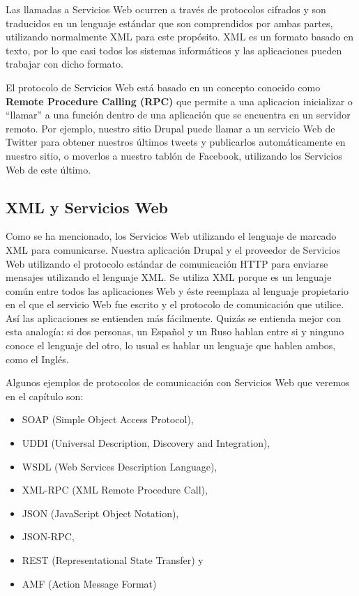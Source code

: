 Las llamadas a Servicios Web ocurren a través de protocolos cifrados y son traducidos en un lenguaje
estándar que son comprendidos por ambas partes, utilizando normalmente XML para este propósito. 
XML es un formato basado en texto, por lo que casi todos los sistemas informáticos y las aplicaciones 
pueden trabajar con dicho formato.

El protocolo de Servicios Web está basado en un concepto conocido como \textbf{Remote Procedure Calling (RPC)}
que permite a una aplicacion inicializar o ``llamar'' a una función dentro de una aplicación que se 
encuentra en un servidor remoto. Por ejemplo, nuestro sitio Drupal puede llamar a un servicio Web de 
Twitter para obtener nuestros últimos tweets y publicarlos automáticamente en nuestro sitio, o 
moverlos a nuestro tablón de Facebook, utilizando los Servicios Web de este último.

\subsection{\large{XML y Servicios Web}}

Como se ha mencionado, los Servicios Web utilizando el lenguaje de marcado XML para comunicarse.
Nuestra aplicación Drupal y el proveedor de Servicios Web utilizando el protocolo estándar de comunicación 
HTTP para enviarse mensajes utilizando el lenguaje XML. Se utiliza XML porque es un lenguaje común entre 
todos las aplicaciones Web y éste reemplaza al lenguaje propietario en el que el servicio Web fue escrito
y el protocolo de comunicación que utilice. Así las aplicaciones se entienden más fácilmente. Quizás se 
entienda mejor con esta analogía: si dos personas, un Español y un Ruso hablan entre si y ninguno conoce 
el lenguaje del otro, lo usual es hablar un lenguaje que hablen ambos, como el Inglés. 

Algunos ejemplos de protocolos de comunicación con Servicios Web que veremos en el capítulo son:
\begin{itemize}
  \item SOAP (Simple Object Access Protocol), 
  \item UDDI (Universal Description, Discovery and Integration),
  \item WSDL (Web Services Description Language),
  \item XML-RPC (XML Remote Procedure Call),
  \item JSON (JavaScript Object Notation),
  \item JSON-RPC,
  \item REST (Representational State Transfer) y
  \item AMF (Action Message Format)  
\end{itemize} 

